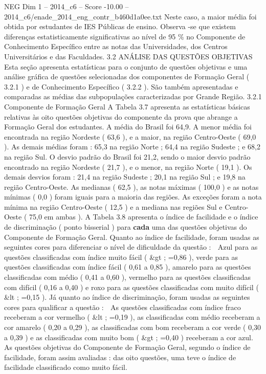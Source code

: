 \begin{textsample}{NEG Dim 1 – 2014\_c6 – Score -10.00 – 2014\_c6/enade\_2014\_eng\_contr\_b460d1a0ee.txt}
Neste caso, a maior média foi obtida por estudantes de IES Públicas de ensino.
Observa -se que existem diferenças estatisticamente significativas ao nível de 95 \% no Componente de Conhecimento Específico entre as notas das Universidades, dos Centros Universitários e das Faculdades. 3.2 ANÁLISE DAS QUESTÕES OBJETIVAS Esta seção apresenta estatísticas para o conjunto de questões objetivas e uma análise gráfica de questões selecionadas dos componentes de Formação Geral ( 3.2.1 ) e de Conhecimento Específico ( 3.2.2 ).
São também apresentadas e comparadas as médias das subpopulações caracterizadas por Grande Região. 3.2.1 Componente de Formação Geral A Tabela 3.7 apresenta as estatísticas básicas relativas às oito questões objetivas do componente da prova que abrange a Formação Geral dos estudantes.
A média do Brasil foi 64,9.
A menor média foi encontrada na região Nordeste ( 63,6 ), e a maior, na região Centro-Oeste ( 69,0 ).
As demais médias foram : 65,3 na região Norte ; 64,4 na região Sudeste ; e 68,2 na região Sul.
O desvio padrão do Brasil foi 21,2, sendo o maior desvio padrão encontrado na região Nordeste ( 21,7 ), e o menor, na região Norte ( 19,1 ).
Os demais desvios foram : 21,4 na região Sudeste ; 20,1 na região Sul ; e 19,8 na região Centro-Oeste.
As medianas ( 62,5 ), as notas máximas ( 100,0 ) e as notas mínimas ( 0,0 ) foram iguais para a maioria das regiões.
As exceções foram a nota mínima na região Centro-Oeste ( 12,5 ) e a mediana nas regiões Sul e Centro-Oeste ( 75,0 em ambas ).
A Tabela 3.8 apresenta o índice de facilidade e o índice de discriminação ( ponto bisserial ) para \textbf{cada} uma das questões objetivas do Componente de Formação Geral.
Quanto ao índice de facilidade, foram usadas as seguintes cores para diferenciar o nível de dificuldade da questão :  Azul para as questões classificadas com índice muito fácil ( \&gt ; =0,86 ), verde para as questões classificadas com índice fácil ( 0,61 a 0,85 ), amarelo para as questões classificadas com médio ( 0,41 a 0,60 ), vermelho para as questões classificadas com difícil ( 0,16 a 0,40 ) e roxo para as questões classificadas com muito difícil ( \&lt ; =0,15 ).
Já quanto ao índice de discriminação, foram usadas as seguintes cores para qualificar a questão :  As questões classificadas com índice fraco receberam a cor vermelho ( \&lt ; =0,19 ), as classificadas com médio receberam a cor amarelo ( 0,20 a 0,29 ), as classificadas com bom receberam a cor verde ( 0,30 a 0,39 ) e as classificadas com muito bom ( \&gt ; =0,40 ) receberam a cor azul.
As questões objetivas do Componente de Formação Geral, segundo o índice de facilidade, foram assim avaliadas : das oito questões, uma teve o índice de facilidade classificado como muito fácil.

\end{textsample}
